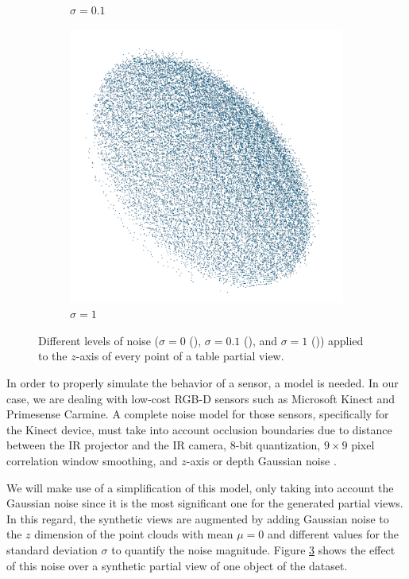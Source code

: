 \begin{figure}[!bh]
\begin{subfigure}{0.32\textwidth}
		\caption{$\sigma=0.1$}
		\label{subfig:objrecog:noise:01}
	\end{subfigure}
	\hfill
	\begin{subfigure}{0.32\textwidth}
		\centering
		\includegraphics[width=\linewidth]{Figures/ObjRecog/stddev_1}
		\caption{$\sigma=1$}
		\label{subfig:objrecog:noise:1}
	\end{subfigure}
	\hfill
	\caption{Different levels of noise ($\sigma=0$ (), $\sigma=0.1$ (), and $\sigma=1$ ()) applied to the $z$-axis of every point of a table partial view.}
	\label{fig:objrecog:noise}
\end{figure}

In order to properly simulate the behavior of a sensor, a model is needed. In our case, we are dealing with low-cost \acs{RGB-D} sensors such as Microsoft Kinect and Primesense Carmine. A complete noise model for those sensors, specifically for the Kinect device, must take into account occlusion boundaries due to distance between the \ac{IR} projector and the \ac{IR} camera, $8$-bit quantization, $9\times9$ pixel correlation window smoothing, and $z$-axis or depth Gaussian noise \cite{Gschwandtner2011}.

We will make use of a simplification of this model, only taking into account the Gaussian noise since it is the most significant one for the generated partial views. In this regard, the synthetic views are augmented by adding Gaussian noise to the $z$ dimension of the point clouds with mean $\mu=0$ and different values for the standard deviation $\sigma$ to quantify the noise magnitude. Figure \ref{fig:objrecog:noise} shows the effect of this noise over a synthetic partial view of one object of the dataset.

